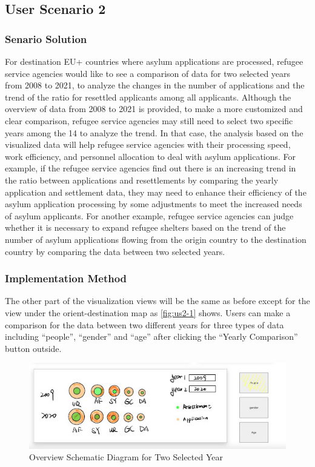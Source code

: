 \documentclass[journal]{vgtc}                %
\begin{document}
\subsection{User Scenario 2}

\subsubsection{Senario Solution}

For destination EU+ countries where asylum applications are processed, refugee service agencies would like to see a comparison of data for two selected years from 2008 to 2021, to analyze the changes in the number of applications and the trend of the ratio for resettled applicants among all applicants. Although the overview of data from 2008 to 2021 is provided, to make a more customized and clear comparison, refugee service agencies may still need to select two specific years among the 14 to analyze the trend. In that case, the analysis based on the visualized data will help refugee service agencies with their processing speed, work efficiency, and personnel allocation to deal with asylum applications. For example, if the refugee service agencies find out there is an increasing trend in the ratio between applications and resettlements by comparing the yearly application and settlement data, they may need to enhance their efficiency of the asylum application processing by some adjustments to meet the increased needs of asylum applicants. For another example, refugee service agencies can judge whether it is necessary to expand refugee shelters based on the trend of the number of asylum applications flowing from the origin country to the destination country by comparing the data between two selected years.

\subsubsection{Implementation Method}

The other part of the visualization views will be the same as before except for the view under the orient-destination map as \autoref{fig:us2-1} shows. Users can make a comparison for the data between two different years for three types of data including “people”, “gender” and “age” after clicking the “Yearly Comparison” button outside. 

\begin{figure}[tb]
  \centering %
  \includegraphics[width=\columnwidth]{fig5}
  \caption{Overview Schematic Diagram for Two Selected Year}
  \label{fig:us2-1}
 \end{figure}
\end{document}
